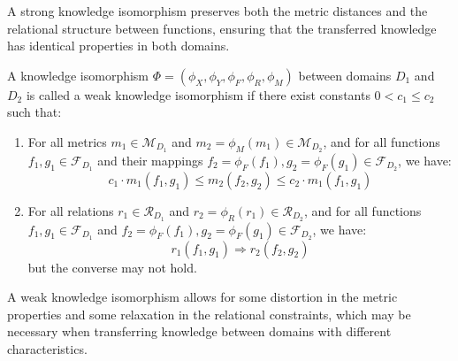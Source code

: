 A strong knowledge isomorphism preserves both the metric distances and the relational structure between functions, ensuring that the transferred knowledge has identical properties in both domains.

\begin{definition}
A knowledge isomorphism $\Phi = (\phi_X, \phi_Y, \phi_F, \phi_R, \phi_M)$ between domains $D_1$ and $D_2$ is called a weak knowledge isomorphism if there exist constants $0 < c_1 \leq c_2$ such that:
\begin{enumerate}
    \item For all metrics $m_1 \in \mathcal{M}_{D_1}$ and $m_2 = \phi_M(m_1) \in \mathcal{M}_{D_2}$, and for all functions $f_1, g_1 \in \mathcal{F}_{D_1}$ and their mappings $f_2 = \phi_F(f_1), g_2 = \phi_F(g_1) \in \mathcal{F}_{D_2}$, we have:
    \begin{equation}
    c_1 \cdot m_1(f_1, g_1) \leq m_2(f_2, g_2) \leq c_2 \cdot m_1(f_1, g_1)
    \end{equation}
    
    \item For all relations $r_1 \in \mathcal{R}_{D_1}$ and $r_2 = \phi_R(r_1) \in \mathcal{R}_{D_2}$, and for all functions $f_1, g_1 \in \mathcal{F}_{D_1}$ and $f_2 = \phi_F(f_1), g_2 = \phi_F(g_1) \in \mathcal{F}_{D_2}$, we have:
    \begin{equation}
    r_1(f_1, g_1) \Rightarrow r_2(f_2, g_2)
    \end{equation}
    but the converse may not hold.
\end{enumerate}
\end{definition}

A weak knowledge isomorphism allows for some distortion in the metric properties and some relaxation in the relational constraints, which may be necessary when transferring knowledge between domains with different characteristics.


